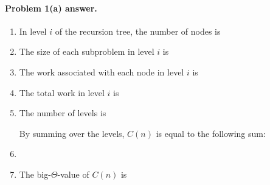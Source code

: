 
\paragraph{Problem 1(a) answer.}


\begin{enumerate}[label=(\roman*)]
\item[] 

  In level $i$ of the recursion tree, the number of nodes is \BLUE{
    \[
      \REPLACEME
    \]
    }
  
\item[] 

  The size of each subproblem in level $i$ is \BLUE{
    \[
      \REPLACEME
    \]
  }

\item[] 

  The work associated with each node in level $i$ is \BLUE{
    \[
      \REPLACEME
    \]
  }

\item[] 

  The total work in level $i$ is \BLUE{
    \[
      \REPLACEME
    \]
  }

\item[]

  The number of levels is \BLUE{
    \[
      \REPLACEME
    \]
  }
  
  By summing over the levels, $C(n)$ is equal to the following sum: 

  \item[]
    \BLUE{
      \[
        \REPLACEME  %
      \]
    }

\item[]
  
  The big-$\Theta$-value of $C(n)$ is \BLUE{
    \[
      \REPLACEME
    \]
  }
  \BLUE{
    \REPLACEME                  %
  }

\end{enumerate}



